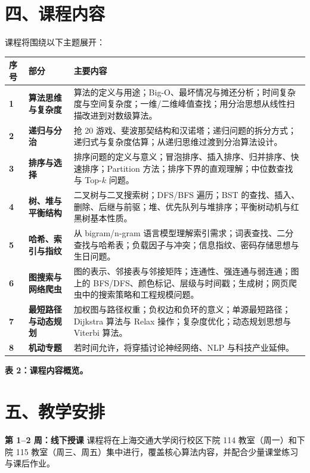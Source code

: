 \documentclass[11pt,a4paper,fontset=none]{ctexart}
\newcommand{\keypoint}[1]{\textbf{\textcolor{emphred}{#1}}}
\newcommand{\captiontext}[1]{\begin{center}{\small \keypoint{#1}}\end{center}}
\begin{document}
\section*{四、课程内容}

课程将围绕以下主题展开：

\begingroup
\renewcommand{\arraystretch}{1.55}
\setlength{\tabcolsep}{7pt}
\noindent\begin{tabularx}{\textwidth}{@{}>{\centering\arraybackslash\bfseries}p{0.9cm}>{\bfseries}p{4.1cm}X@{}}
\toprule
\keypoint{序号} & \keypoint{部分} & \keypoint{主要内容} \\
\midrule
1 & 算法思维与复杂度 & 算法的定义与用途；Big-O、最坏情况与摊还分析；时间复杂度与空间复杂度；一维/二维峰值查找；用分治思想从线性扫描改进到对数级算法。 \\
2 & 递归与分治 & 抢 20 游戏、斐波那契结构和汉诺塔；递归问题的拆分方式；递归式与复杂度估算；从递归思维过渡到分治算法设计。 \\
3 & 排序与选择 & 排序问题的定义与意义；冒泡排序、插入排序、归并排序、快速排序；Partition 方法；排序下界的直观理解；中位数查找与 Top-$k$ 问题。 \\
4 & 树、堆与平衡结构 & 二叉树与二叉搜索树；DFS/BFS 遍历；BST 的查找、插入、删除、后继与前驱；堆、优先队列与堆排序；平衡树动机与红黑树基本性质。 \\
5 & 哈希、索引与指纹 & 从 bigram/n-gram 语言模型理解索引需求；词表查找、二分查找与哈希表；负载因子与冲突；信息指纹、密码存储思想与生日问题。 \\
6 & 图搜索与网络爬虫 & 图的表示、邻接表与邻接矩阵；连通性、强连通与弱连通；图上的 BFS/DFS、颜色标记、层级与时间戳；生成树；网页爬虫中的搜索策略和工程规模问题。 \\
7 & 最短路径与动态规划 & 加权图与路径权重；负权边和负环的意义；单源最短路径；Dijkstra 算法与 Relax 操作；复杂度优化；动态规划思想与 Viterbi 算法。 \\
8 & 机动专题 & 若时间允许，将穿插讨论神经网络、NLP 与科技产业延伸。 \\
\bottomrule
\end{tabularx}
\captiontext{表 2：课程内容概览。}
\endgroup

\section*{五、教学安排}

\keypoint{第 1--2 周：线下授课} 课程将在上海交通大学闵行校区下院 114 教室（周一）和下院 115 教室（周三、周五）集中进行，覆盖核心算法内容，并配合少量课堂练习与课后作业。
\end{document}
